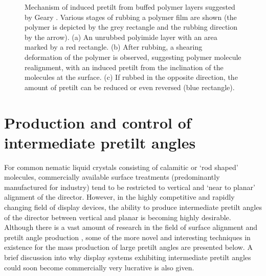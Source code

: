 \begin{figure}
\begin{center}
\end{center}
\caption[Schematic diagram of proposed mechanism behind production of pretilt from rubbed polymer layers]{\label{fig:rubbedpolymer}Mechanism of induced pretilt from buffed polymer layers suggested by Geary \cite{Geary1987}. Various stages of rubbing a polymer film are shown (the polymer is depicted by the grey rectangle and the rubbing direction by the arrow). (a) An unrubbed polyimide layer with an area marked by a red rectangle. (b) After rubbing, a shearing deformation of the polymer is observed, suggesting polymer molecule realignment, with an induced pretilt from the inclination of the molecules at the surface. (c) If rubbed in the opposite direction, the amount of pretilt can be reduced or even reversed (blue rectangle).}
\end{figure}

\section{Production and control of intermediate pretilt angles}
For common nematic liquid crystals consisting of calamitic or `rod shaped' molecules, commercially  available surface treatments (predominantly manufactured for industry) tend to be restricted to vertical and `near to planar' alignment of the director. However, in the highly competitive and rapidly changing field of display devices, the ability to produce intermediate pretilt angles of the director between vertical and planar is becoming highly desirable. Although there is a vast amount of research in the field of surface alignment and pretilt angle production \cite{Nov1987,Fuh2009,Honma2007,Kim2002,Paek1998,Reznikov2000,Sakamoto1996,Search1991,Shah2001}, some of the more novel and interesting techniques in existence for the mass production of large pretilt angles are presented below. A brief discussion into why display systems exhibiting intermediate pretilt angles could soon become commercially very lucrative is also given.

